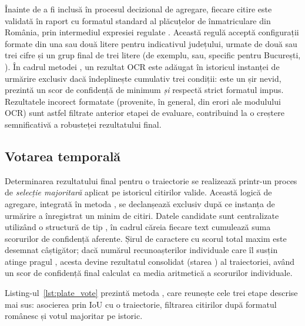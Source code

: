\documentclass[../../main.tex]{subfiles}
\begin{document}
Înainte de a fi inclusă în procesul decizional de agregare, fiecare citire este validată în raport cu formatul standard al plăcuțelor de înmatriculare din România, prin intermediul expresiei regulate . Această regulă acceptă configurații formate din una sau două litere pentru indicativul județului, urmate de două sau trei cifre și un grup final de trei litere (de exemplu,  sau, specific pentru București, ). În cadrul metodei  , un rezultat OCR este adăugat în istoricul instanței de urmărire exclusiv dacă îndeplinește cumulativ trei condiții: este un șir nevid, prezintă un scor de confidență de minimum  \textit{și} respectă strict formatul impus. Rezultatele incorect formatate (provenite, în general, din erori ale modulului OCR) sunt astfel filtrate anterior etapei de evaluare, contribuind la o creștere semnificativă a robusteței rezultatului final.

\subsection{Votarea temporală}
\label{subsec:votare_temporala}

Determinarea rezultatului final pentru o traiectorie se realizează printr-un proces de \textit{selecție majoritară} aplicat pe istoricul citirilor valide. Această logică de agregare, integrată în metoda , se declanșează exclusiv după ce instanța de urmărire a înregistrat un minim de  citiri. Datele candidate sunt centralizate utilizând o structură de tip , în cadrul căreia fiecare text cumulează suma scorurilor de confidență aferente. Șirul de caractere cu scorul total maxim este desemnat câștigător; dacă numărul recunoașterilor individuale care îl susțin atinge pragul , acesta devine rezultatul consolidat (starea ) al traiectoriei, având un scor de confidență final calculat ca media aritmetică a scorurilor individuale.

Listing-ul~\ref{lst:plate_vote} prezintă metoda , care reunește cele trei etape descrise mai sus: asocierea prin IoU cu o traiectorie, filtrarea citirilor după formatul românesc și votul majoritar pe istoric.
\end{document}
